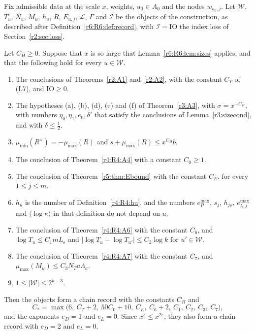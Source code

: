 Fix admissible data at the scale $x$, weights, $u_0\in A_0$ and the nodes $w_{u_0,j}$. Let $\mathcal W$, $T_u$, $N_u$, $M_u$, $h_u$, $R$, $E_{u,j}$, $\mathcal L$, $\Gamma$ and $\mathcal I$ be the objects of the construction, as described after Definition~\ref{r6:R6:def:record}, with $\mathcal I=\mathrm{IO}$ the index loss of Section~\ref{r2:sec:loss}.

\begin{proposition}\label{a8:prop:record}
Let $C_H\ge0$. Suppose that $x$ is so large that Lemma~\ref{r6:R6:lem:sizes} applies, and that the following hold for every $u\in\mathcal W$.
\begin{enumerate}
\item[(i)] The conclusions of Theorems~\ref{r2:A1} and~\ref{r2:A2}, with the constant $C_T$ of (L7), and $\mathrm{IO}\ge0$.
\item[(ii)] The hypotheses (a), (b), (d), (e) and (f) of Theorem~\ref{r3:A3}, with $\sigma=x^{-C_H}$, with numbers $\eta_0,\eta_1,e_0,\delta'$ that satisfy the conclusions of Lemma~\ref{r3:sizecond}, and with $\delta\le\frac12$.
\item[(iii)] $\mu_{\min}(R^\vee)=-\mu_{\max}(R)$ and $s+\mu_{\max}(R)\le x^{C_H}b$.
\item[(iv)] The conclusion of Theorem~\ref{r4:R4:A4} with a constant $C_0\ge1$.
\item[(v)] The conclusion of Theorem~\ref{r5:thm:Ebound} with the constant $C_E$, for every $1\le j\le m$.
\item[(vi)] $h_u$ is the number of Definition~\ref{r4:R4:hu}, and the numbers $e^{\max}_P$, $s_j$, $h_{j\rho}$, $e^{\max}_{\lambda,j}$ and $\langle\log\kappa\rangle$ in that definition do not depend on $u$.
\item[(vii)] The conclusion of Theorem~\ref{r4:R4:A6} with the constant $C_6$, and $\log T_u\le C_1mL_\varepsilon$ and $\lvert\log T_u-\log T_{u'}\rvert\le C_2\log k$ for $u'\in\mathcal W$.
\item[(viii)] The conclusion of Theorem~\ref{r4:R4:A7} with the constant $C_7$, and $\mu_{\max}(M_u)\le C_3N_Ta\Lambda_a$.
\item[(ix)] $1\le\lvert\mathcal W\rvert\le2^{k-3}$.
\end{enumerate}
Then the objects form a chain record with the constants $C_H$ and
\[
C_\ast=\max\big(6,\ C_T+2,\ 50C_0+10,\ C_E,\ C_6+2,\ C_1,\ C_2,\ C_3,\ C_7\big),
\]
and the exponents $e_D=1$ and $e_L=0$. Since $x^{\varepsilon}\le x^{2\varepsilon}$, they also form a chain record with $e_D=2$ and $e_L=0$.
\end{proposition}

